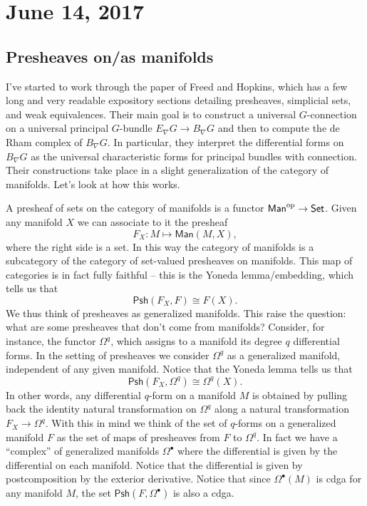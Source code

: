 \documentclass{amsart}
\begin{document}
\section{June 14, 2017}

\subsection{Presheaves on/as manifolds}
I've started to work through the paper of Freed and Hopkins, which has a few
long and very readable expository sections detailing presheaves, simplicial sets,
and weak equivalences.
Their main goal is to construct a universal $G$-connection on a universal
principal $G$-bundle $E_\nabla G\to B_\nabla G$ and then to compute
the de Rham complex of $B_\nabla G$. In particular, they interpret the
differential forms on $B_\nabla G$ as the universal characteristic forms
for principal bundles with connection. Their constructions take place
in a slight generalization of the category of manifolds. Let's look at
how this works.

A presheaf of sets on the category of manifolds is a functor $\sf{Man}^\text{op}\to\sf Set$.
Given any manifold $X$ we can associate to it the presheaf
\begin{equation*}
    F_X:M\mapsto \textsf{Man}(M, X),
\end{equation*}
where the right side is a set.  In this way the category of manifolds is a
subcategory of the category of set-valued presheaves on manifolds. This map
of categories is in fact fully faithful -- this is the Yoneda lemma/embedding,
which tells us that
\begin{equation*}
    \textsf{Psh}(F_X, F) \cong F(X).
\end{equation*}
We thus think of presheaves as generalized manifolds. This raise the question:
what are some presheaves that don't come from manifolds?  Consider, for instance,
the functor $\Omega^q$, which assigns to a manifold its degree $q$ differential
forms. In the setting of presheaves we consider $\Omega^q$ as a generalized
manifold, independent of any given manifold. Notice that the Yoneda lemma tells
us that
\begin{equation*}
    \textsf{Psh}(F_X,\Omega^q) \cong \Omega^q(X).
\end{equation*}
In other words, any differential $q$-form on a manifold $M$ is obtained by
pulling back the identity natural transformation on $\Omega^q$ along a natural
transformation $F_X\to\Omega^q$. With this in mind we think of the set of
$q$-forms on a generalized manifold $F$ as the set of maps of presheaves
from $F$ to $\Omega^q$.
In fact we have a ``complex'' of generalized manifolds $\Omega^\bullet$ 
where the differential is given by the differential on each manifold.
Notice that the differential is given by postcomposition by the exterior
derivative.
Notice that since $\Omega^\bullet(M)$ is cdga for
any manifold $M$, the set $\textsf{Psh}(F,\Omega^\bullet)$ is also a cdga.
\end{document}
